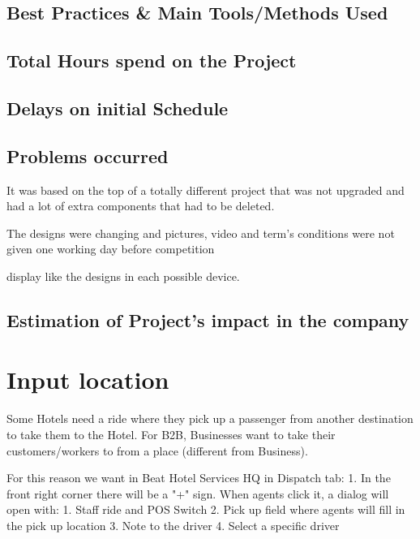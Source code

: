 \subsection{Best Practices \& Main Tools/Methods Used}

\subsection{Total Hours spend on the Project}

\subsection{Delays on initial Schedule}

\subsection{Problems occurred}

It was based on the top of a totally different project that was not upgraded and had a lot of extra components that had to be deleted.

The designs were changing and pictures, video and term's conditions were not given one working day before competition

display like the designs in each possible device.

\subsection{Estimation of Project's impact in the company}

\section{Input location}


Some Hotels need a ride where they pick up a passenger from another destination to take them to the Hotel.
For B2B, Businesses want to take their customers/workers to from a place (different from Business).

For this reason we want in Beat Hotel Services HQ in Dispatch tab:
1.	In the front right corner there will be a "+" sign.
When agents click it, a dialog will open with:
1.	Staff ride and POS Switch
2.	Pick up field where agents will fill in the pick up location
3.	Note to the driver
4.	Select a specific driver

